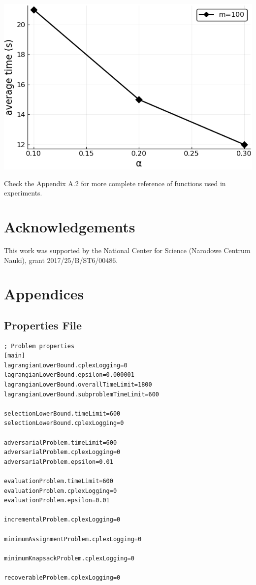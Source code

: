 \includegraphics[width=\textwidth]{plot.png}

Check the Appendix A.2 for more complete reference of functions used in experiments.

\section{Acknowledgements}
This work was supported by the National Center for Science (Narodowe Centrum Nauki), grant 2017/25/B/ST6/00486.

\clearpage
\appendix
\section{Appendices}

\subsection{Properties File}
\label{sec:properties}
\begin{lstlisting}
; Problem properties
[main]
lagrangianLowerBound.cplexLogging=0
lagrangianLowerBound.epsilon=0.000001
lagrangianLowerBound.overallTimeLimit=1800
lagrangianLowerBound.subproblemTimeLimit=600

selectionLowerBound.timeLimit=600
selectionLowerBound.cplexLogging=0

adversarialProblem.timeLimit=600
adversarialProblem.cplexLogging=0
adversarialProblem.epsilon=0.01

evaluationProblem.timeLimit=600
evaluationProblem.cplexLogging=0
evaluationProblem.epsilon=0.01

incrementalProblem.cplexLogging=0

minimumAssignmentProblem.cplexLogging=0

minimumKnapsackProblem.cplexLogging=0

recoverableProblem.cplexLogging=0
\end{lstlisting}
\clearpage

\setcounter{subsection}{+1}


{}


